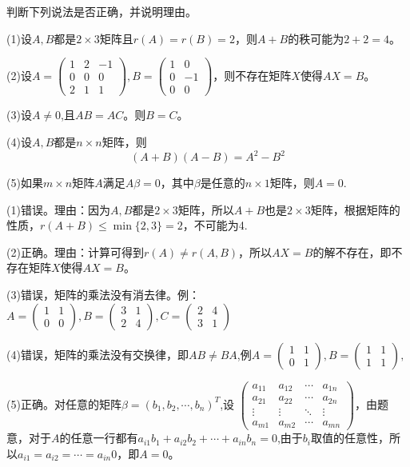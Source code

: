 \documentclass[a4paper]{report}
\begin{document}
\EX 判断下列说法是否正确，并说明理由。

(1)设$A,B$都是$2\times3$矩阵且$r(A)=r(B)=2$，则$A+B$的秩可能为$2+2=4$。

(2)设$A=
\begin{pmatrix}
1&2&-1\\
0&0&0\\
2&1&1
\end{pmatrix},B=
\begin{pmatrix}
1&0\\
0&-1\\
0&0
\end{pmatrix}
$，则不存在矩阵$X$使得$AX=B$。

(3)设$A\neq 0$,且$AB=AC$。则$B=C$。

(4)设$A,B$都是$n\times n$矩阵，则
\begin{equation*}
  (A+B)(A-B)=A^2-B^2
\end{equation*}

(5)如果$m\times n$矩阵$A$满足$A\beta=0$，其中$\beta$是任意的$n\times 1$矩阵，则$A=0$.

\begin{jie}
(1)错误。理由：因为$A,B$都是$2\times3$矩阵，所以$A+B$也是$2\times3$矩阵，根据矩阵的性质，$r(A+B)\leq \min\{2,3\}=2$，不可能为4.

(2)正确。理由：计算可得到$r(A)\neq r(A,B)$，所以$AX=B$的解不存在，即不存在矩阵$X$使得$AX=B$。

(3)错误，矩阵的乘法没有消去律。例：$A=
\begin{pmatrix}
1 &1\\ 0&0
\end{pmatrix}
,B=
\begin{pmatrix}
3 &1\\ 2&4
\end{pmatrix},C=
\begin{pmatrix}
2&4\\ 3 &1
\end{pmatrix}
$

(4)错误，矩阵的乘法没有交换律，即$AB\neq BA$,例$A=\begin{pmatrix}
1 &1\\ 0&1
\end{pmatrix}
,B=\begin{pmatrix}
1 &1\\ 1&1
\end{pmatrix}
,$

(5)正确。对任意的矩阵$\beta=(b_1,b_2,\cdots,b_{n})^{T}$,设
$
\begin{pmatrix}
a_{11}&a_{12}&\cdots&a_{1n}\\
a_{21}&a_{22}&\cdots&a_{2n}\\
\vdots&\vdots&\ddots&\vdots\\
a_{m1}&a_{m2}&\cdots&a_{mn}
\end{pmatrix}
$，由题意，对于$A$的任意一行都有$a_{i1}b_1+a_{i2}b_2+\cdots+a_{in}b_n=0$,由于$b_i$取值的任意性，所以$a_{i1} = a_{i2}=\cdots=a_{in}0$，即$A=0$。
\end{jie}
\end{document}
